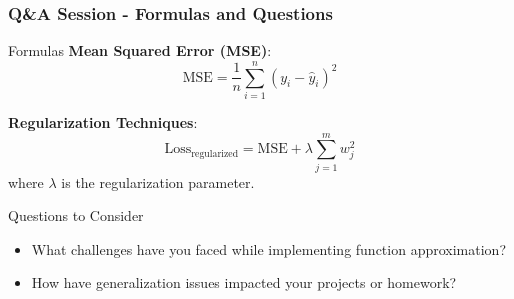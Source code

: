 \documentclass[aspectratio=169]{beamer}
\begin{document}
\begin{frame}[fragile]
  \frametitle{Q\&A Session - Formulas and Questions}
  \begin{block}{Formulas}
    \textbf{Mean Squared Error (MSE)}:
    \begin{equation}
      \text{MSE} = \frac{1}{n} \sum_{i=1}^{n} (y_i - \hat{y}_i)^2
    \end{equation}

    \textbf{Regularization Techniques}:
    \begin{equation}
      \text{Loss}_{\text{regularized}} = \text{MSE} + \lambda \sum_{j=1}^{m} w_j^2
    \end{equation}
    where \(\lambda\) is the regularization parameter.
  \end{block}

  \begin{block}{Questions to Consider}
    \begin{itemize}
      \item What challenges have you faced while implementing function approximation?
      \item How have generalization issues impacted your projects or homework?
    \end{itemize}
  \end{block}
\end{frame}
\end{document}
